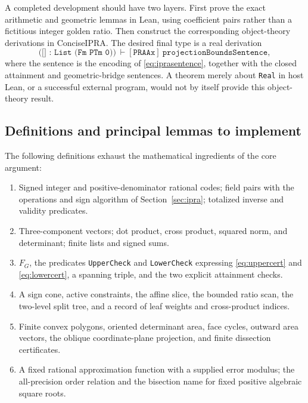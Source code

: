 \documentclass[11pt,a4paper]{article}
\newcommand{\code}[1]{\texttt{#1}}
\begin{document}
A completed development should have two layers. First prove the exact arithmetic and geometric lemmas in Lean, using coefficient pairs rather than a fictitious integer golden ratio. Then construct the corresponding object-theory derivations in ConciseIPRA. The desired final type is a real derivation
\[
 \code{([] : List (Fm PTm 0))}\ \vdash[\code{PRAAx}]\ 
 \code{projectionBoundsSentence},
\]
where the sentence is the encoding of \eqref{eq:iprasentence}, together with the closed attainment and geometric-bridge sentences. A theorem merely about \code{Real} in host Lean, or a successful external program, would not by itself provide this object-theory result.

\subsection{Definitions and principal lemmas to implement}
The following definitions exhaust the mathematical ingredients of the core argument:
\begin{enumerate}
\item Signed integer and positive-denominator rational codes; field pairs with the operations and sign algorithm of Section~\ref{sec:ipra}; totalized inverse and validity predicates.
\item Three-component vectors; dot product, cross product, squared norm, and determinant; finite lists and signed sums.
\item $F_G$, the predicates \code{UpperCheck} and \code{LowerCheck} expressing \eqref{eq:uppercert} and \eqref{eq:lowercert}, a spanning triple, and the two explicit attainment checks.
\item A sign cone, active constraints, the affine slice, the bounded ratio scan, the two-level split tree, and a record of leaf weights and cross-product indices.
\item Finite convex polygons, oriented determinant area, face cycles, outward area vectors, the oblique coordinate-plane projection, and finite dissection certificates.
\item A fixed rational approximation function with a supplied error modulus; the all-precision order relation and the bisection name for fixed positive algebraic square roots.
\end{enumerate}
\end{document}
